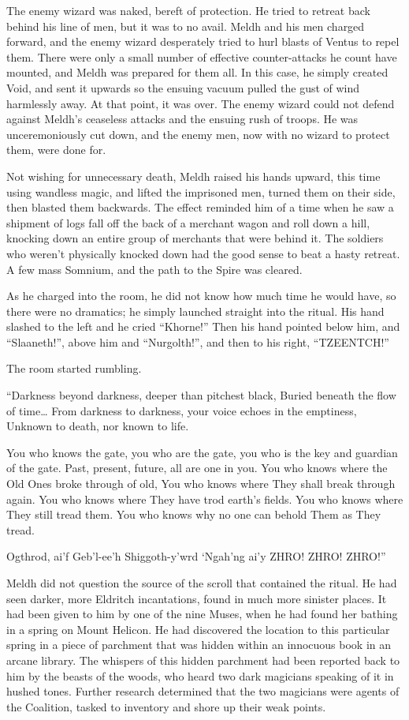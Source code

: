The enemy wizard was naked, bereft of protection. He tried to retreat back behind his line of men, but it was to no avail. Meldh and his men charged forward, and the enemy wizard desperately tried to hurl blasts of Ventus to repel them. There were only a small number of effective counter-attacks he count have mounted, and Meldh was prepared for them all. In this case, he simply created Void, and sent it upwards so the ensuing vacuum pulled the gust of wind harmlessly away. At that point, it was over. The enemy wizard could not defend against Meldh’s ceaseless attacks and the ensuing rush of troops. He was unceremoniously cut down, and the enemy men, now with no wizard to protect them, were done for.

Not wishing for unnecessary death, Meldh raised his hands upward, this time using wandless magic, and lifted the imprisoned men, turned them on their side, then blasted them backwards. The effect reminded him of a time when he saw a shipment of logs fall off the back of a merchant wagon and roll down a hill, knocking down an entire group of merchants that were behind it. The soldiers who weren’t physically knocked down had the good sense to beat a hasty retreat. A few mass Somnium, and the path to the Spire was cleared.

As he charged into the room, he did not know how much time he would have, so there were no dramatics; he simply launched straight into the ritual. His hand slashed to the left and he cried “Khorne!” Then his hand pointed below him, and “Slaaneth!”, above him and “Nurgolth!”, and then to his right, “TZEENTCH!”

The room started rumbling.

“Darkness beyond darkness,
deeper than pitchest black,
Buried beneath the flow of time…
From darkness to darkness,
your voice echoes in the emptiness,
Unknown to death, nor known to life.

You who knows the gate, you who are the gate,
you who is the key and guardian of the gate.
Past, present, future, all are one in you.
You who knows where the Old Ones broke through of old,
You who knows where They shall break through again.
You who knows where They have trod earth’s fields.
You who knows where They still tread them.
You who knows why no one can behold Them as They tread.

Ogthrod, ai’f
Geb’l-ee’h
Shiggoth-y’wrd
‘Ngah’ng ai’y
ZHRO!
ZHRO!
ZHRO!”

Meldh did not question the source of the scroll that contained the ritual. He had seen darker, more Eldritch incantations, found in much more sinister places. It had been given to him by one of the nine Muses, when he had found her bathing in a spring on Mount Helicon. He had discovered the location to this particular spring in a piece of parchment that was hidden within an innocuous book in an arcane library. The whispers of this hidden parchment had been reported back to him by the beasts of the woods, who heard two dark magicians speaking of it in hushed tones. Further research determined that the two magicians were agents of the Coalition, tasked to inventory and shore up their weak points.

